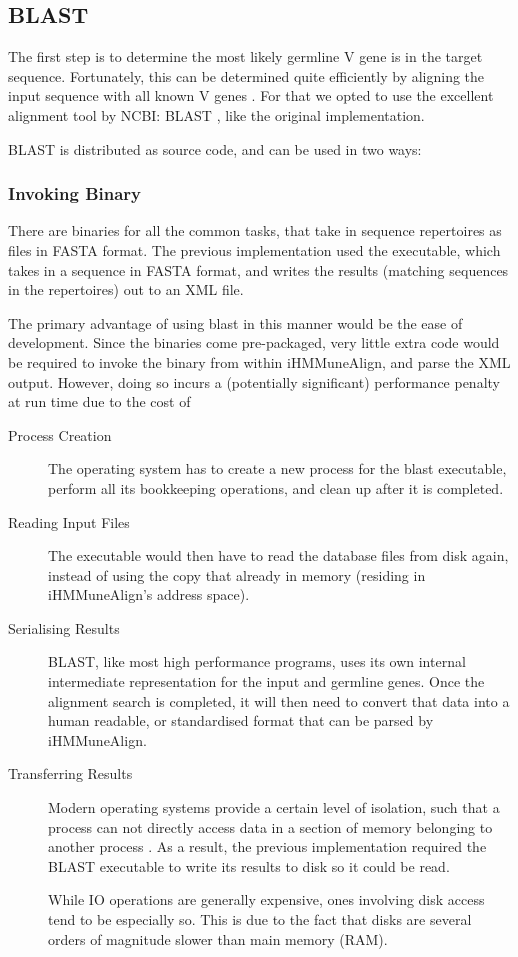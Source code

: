 \subsection{BLAST}
The first step is to determine the most likely germline V gene is in the target sequence. Fortunately, this can be determined quite efficiently by aligning the input sequence with all known V genes \cite{iHMMuneAlign}. For that we opted to use the excellent alignment tool by NCBI: BLAST \cite{blast}, like the original implementation.

BLAST is distributed as source code, and can be used in two ways:
\subsubsection{Invoking Binary}
There are binaries for all the common tasks, that take in sequence repertoires as files in FASTA \autocite{fasta} format. The previous implementation used the  executable, which takes in a sequence in FASTA format, and writes the results (matching sequences in the repertoires) out to an XML file.

The primary advantage of using blast in this manner would be the ease of development. Since the binaries come pre-packaged, very little extra code would be required to invoke the binary from within iHMMuneAlign, and parse the XML output. However, doing so incurs a (potentially significant) performance penalty at run time due to the cost of

\begin{description}
	\item[Process Creation]
	The operating system has to create a new process for the blast executable, perform all its bookkeeping operations, and clean up after it is completed.
	\item[Reading Input Files]
	The executable would then have to read the database files from disk again, instead of using the copy that already in memory (residing in iHMMuneAlign's address space).
	\item[Serialising Results]
	BLAST, like most high performance programs, uses its own internal intermediate representation for the input and germline genes\autocite{blast}. Once the alignment search is completed, it will then need to convert that data into a human readable, or standardised format that can be parsed by iHMMuneAlign.
	\item[Transferring Results]
    Modern operating systems provide a certain level of isolation, such that a process can not directly access data in a section of memory belonging to another process \autocite{address-spaces}. As a result, the previous implementation required the BLAST executable to write its results to disk so it could be read.
    
    While IO operations are generally expensive, ones involving disk access tend to be especially so. This is due to the fact that disks are several orders of magnitude slower than main memory (RAM). 
	
\end{description}

